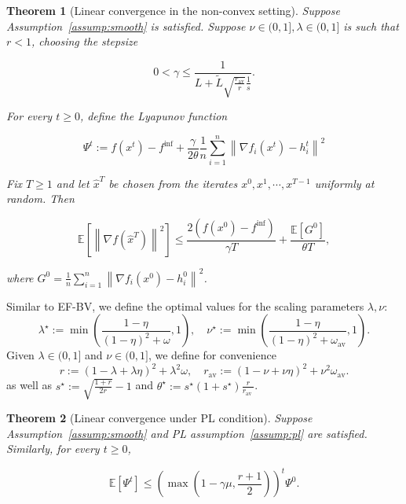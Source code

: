 \documentclass{article} %
\newcommand{\algname}[1]{{\sf\green\relscale{0.90}#1}\xspace}
\theoremstyle{plain}
\newtheorem{theorem}{Theorem}[section]
\theoremstyle{definition}
\theoremstyle{remark}
\newcommand{\green}{\color{mydarkgreen}}
\newcommand{\sqnorm}[1]{\left\| #1 \right\|^2}
\begin{document}
   \begin{theorem}[Linear convergence in the non-convex setting]\label{thm:main}
      Suppose Assumption~\ref{assump:smooth} is satisfied. Suppose $\nu\in (0, 1], \lambda\in (0,1]$ is such that $r < 1$, choosing the stepsize 
      
      $$0< \gamma \leq \frac{1}{L + \tilde{L}\sqrt{\frac{r_{\mathrm{av}}}{r}}\frac{1}{s}}.$$

      For every $t\geq 0$, define the Lyapunov function

      \begin{equation}
         \Psi^{t}:=f\left(x^{t}\right)-f^{\inf}+\frac{\gamma}{2 \theta} \frac{1}{n} \sum_{i=1}^{n}\left\|\nabla f_{i}\left(x^{t}\right)-h_{i}^{t}\right\|^{2}
         \end{equation}
      
      Fix $T\geq 1$ and let $\hat{x}^T$ be chosen from the iterates $x^0, x^1, \cdots, x^{T-1}$ uniformly at random. Then 

      \begin{equation}
         \mathbb{E}\left[\left\|\nabla f\left(\hat{x}^{T}\right)\right\|^{2}\right] \leq \frac{2\left(f\left(x^{0}\right)-f^{\inf}\right)}{\gamma T}+\frac{\mathbb{E}\left[G^{0}\right]}{\theta T},
         \end{equation}

      where $G^0=\frac{1}{n}\sum_{i=1}^n \sqnorm{\nabla f_i(x^0) - h_i^0}$.
   \end{theorem}

   Similar to \algname{EF-BV}, we define the optimal values for the scaling parameters $\lambda, \nu$:
   $$
   \lambda^{\star}:=\min \left(\frac{1-\eta}{(1-\eta)^{2}+\omega}, 1\right), \quad \nu^{\star}:=\min \left(\frac{1-\eta}{(1-\eta)^{2}+\omega_{\mathrm{av}}}, 1\right) .
   $$
   Given $\lambda \in(0,1]$ and $\nu \in(0,1]$, we define for convenience
   $$
   r:=(1-\lambda+\lambda \eta)^{2}+\lambda^{2} \omega, \quad r_{\mathrm{av}}:=(1-\nu+\nu \eta)^{2}+\nu^{2} \omega_{\mathrm{av}} .
   $$
   as well as $s^{\star}:=\sqrt{\frac{1+r}{2 r}}-1$ and $\theta^{\star}:=s^{\star}\left(1+s^{\star}\right) \frac{r}{r_{\text {av }}}$.

   \begin{theorem}[Linear convergence under PL condition]\label{thm:main_pl}
      Suppose Assumption~\ref{assump:smooth} and PL assumption~\ref{assump:pl} are satisfied. Similarly, for every $t\geq 0$, 

      \begin{equation}
         \mathbb{E}\left[\Psi^{t}\right] \leq\left(\max \left(1-\gamma \mu, \frac{r+1}{2}\right)\right)^{t} \Psi^{0}.
         \end{equation}
   \end{theorem}
\end{document}
